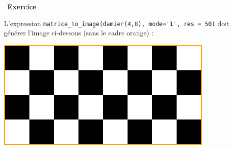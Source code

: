 \documentclass[a4paper, french, 12pt]{article}
\newcounter{exo}
\newenvironment{exercice}[1]
{\par \medskip   \addtocounter{exo}{1} \noindent  
\begin{bclogo}[arrondi =0.1,   noborder = true, logo=\bccrayon, marge=4]{~\textbf{Exercice} \textbf{\theexo} {\itshape #1} }  \par}
{
\end{bclogo}
 \par \bigskip }
\begin{document}
\begin{exercice}{}
\begin{enumerate}
L'expression \lstinline+matrice_to_image(damier(4,8), mode='1', res = 50)+ doit générer l'image ci-dessous (sans le cadre orange) :

\begin{center}
\includegraphics[scale=0.5]{images/damier-cadre.png}
\end{center}
\end{enumerate}

\end{exercice}

\vspace*{-20pt}
\end{document}
